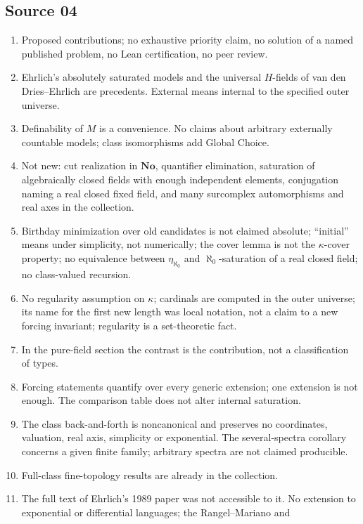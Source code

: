\documentclass[11pt,letterpaper]{article}
\numberwithin{equation}{section}
\theoremstyle{definition}
\theoremstyle{remark}
\newcommand{\No}{\mathbf{No}}
\begin{document}
\subsection*{Source 04}
\begin{enumerate}[label=04.\arabic*,leftmargin=3.2em]
\item Proposed contributions; no exhaustive priority claim, no solution of a
named published problem, no Lean certification, no peer review.
\item Ehrlich's absolutely saturated models and the universal $H$-fields of van
den Dries--Ehrlich are precedents. External means internal to the specified
outer universe.
\item Definability of $M$ is a convenience. No claims about arbitrary externally
countable models; class isomorphisms add Global Choice.
\item Not new: cut realization in $\No$, quantifier elimination, saturation of
algebraically closed fields with enough independent elements, conjugation naming
a real closed fixed field, and many surcomplex automorphisms and real axes in the
collection.
\item Birthday minimization over old candidates is not claimed absolute;
``initial'' means under simplicity, not numerically; the cover lemma is not the
$\kappa$-cover property; no equivalence between $\eta_{\aleph_0}$ and
$\aleph_0$-saturation of a real closed field; no class-valued recursion.
\item No regularity assumption on $\kappa$; cardinals are computed in the outer
universe; its name for the first new length was local notation, not a claim to
a new forcing invariant; regularity is a set-theoretic fact.
\item In the pure-field section the contrast is the contribution, not a
classification of types.
\item Forcing statements quantify over every generic extension; one extension
is not enough. The comparison table does not alter internal saturation.
\item The class back-and-forth is noncanonical and preserves no coordinates,
valuation, real axis, simplicity or exponential. The several-spectra corollary
concerns a given finite family; arbitrary spectra are not claimed producible.
\item Full-class fine-topology results are already in the collection.
\item The full text of Ehrlich's 1989 paper was not accessible to it. No
extension to exponential or differential languages; the Rangel--Mariano and

\end{enumerate}
\end{document}
